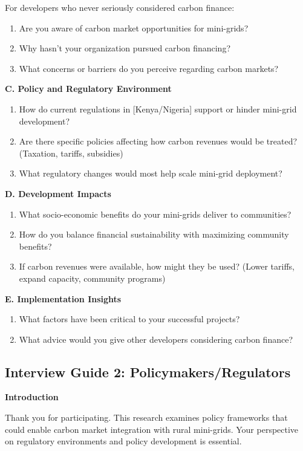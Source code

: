 For developers who never seriously considered carbon finance:
\begin{enumerate}[start=3]
	\item Are you aware of carbon market opportunities for mini-grids?
	\item Why hasn't your organization pursued carbon financing?
	\item What concerns or barriers do you perceive regarding carbon markets?
\end{enumerate}

\textbf{C. Policy and Regulatory Environment}
\begin{enumerate}[start=8]
	\item How do current regulations in [Kenya/Nigeria] support or hinder mini-grid development?
	\item Are there specific policies affecting how carbon revenues would be treated? (Taxation, tariffs, subsidies)
	\item What regulatory changes would most help scale mini-grid deployment?
\end{enumerate}

\textbf{D. Development Impacts}
\begin{enumerate}[resume]
	\item What socio-economic benefits do your mini-grids deliver to communities?
	\item How do you balance financial sustainability with maximizing community benefits?
	\item If carbon revenues were available, how might they be used? (Lower tariffs, expand capacity, community programs)
\end{enumerate}

\textbf{E. Implementation Insights}
\begin{enumerate}[resume]
	\item What factors have been critical to your successful projects?
	\item What advice would you give other developers considering carbon finance?
\end{enumerate}

\subsection{Interview Guide 2: Policymakers/Regulators}
\textbf{Introduction}

Thank you for participating. This research examines policy frameworks that could enable carbon market integration with rural mini-grids. Your perspective on regulatory environments and policy development is essential.

